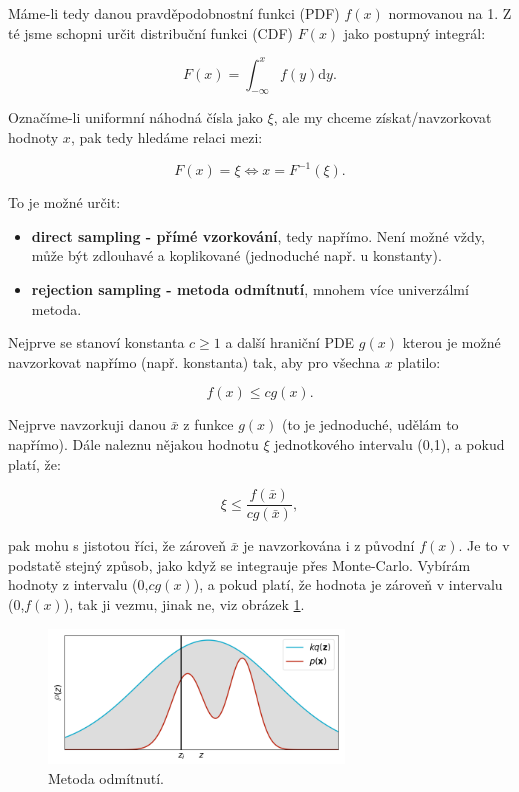 Máme-li tedy danou pravděpodobnostní funkci (PDF) $f(x)$ normovanou na 1. Z té jsme schopni určit distribuční funkci (CDF) $F(x)$ jako postupný integrál:

$$ F(x) = \int_{-\infty}^x f(y) \text{d}y. $$

Označíme-li uniformní náhodná čísla jako $\xi$, ale my chceme získat/navzorkovat hodnoty $x$, pak tedy hledáme relaci mezi:

$$ F(x) = \xi \iff x = F^{-1}(\xi). $$

To je možné určit:

\begin{itemize}
  \item \textbf{direct sampling - přímé vzorkování}, tedy napřímo. Není možné vždy, může být zdlouhavé a koplikované (jednoduché např. u konstanty).
  \item \textbf{rejection sampling - metoda odmítnutí}, mnohem více univerzálmí metoda.
\end{itemize}

Nejprve se stanoví konstanta $c \geq 1$ a další hraniční PDE $g(x)$ kterou je možné navzorkovat napřímo (např. konstanta) tak, aby pro všechna $x$ platilo:

$$ f(x) \leq c g(x). $$

Nejprve navzorkuji danou $\bar{x}$ z funkce $g(x)$ (to je jednoduché, udělám to napřímo). Dále naleznu nějakou hodnotu $\xi$  jednotkového intervalu (0,1), a pokud platí, že:

$$ \xi \leq \dfrac{f(\bar{x})}{c g(\bar{x})}, $$

pak mohu s jistotou říci, že zároveň $\bar{x}$ je navzorkována i z původní $f(x)$. Je to v podstatě stejný způsob, jako když se integrauje přes Monte-Carlo. Vybírám hodnoty z intervalu (0,$cg(x)$), a pokud platí, že hodnota je zároveň v intervalu (0,$f(x)$), tak ji vezmu, jinak ne, viz obrázek \ref{rejection}.

\begin{figure}[H]
  \centering
  \includegraphics[width=0.7\textwidth]{img/rejection_sampling.png}
  \caption{Metoda odmítnutí.}
  \label{rejection}
\end{figure}


